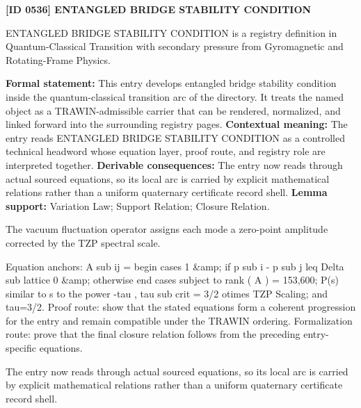 \clearpage
\noindent\textbf{[ID 0536] ENTANGLED BRIDGE STABILITY CONDITION}\par
\vspace{0.35em}
\begingroup\small
{}
ENTANGLED BRIDGE STABILITY CONDITION is a registry definition in Quantum-Classical Transition with secondary pressure from Gyromagnetic and Rotating-Frame Physics.

\begingroup\footnotesize\setlength{\emergencystretch}{3em}\sloppy
\textbf{Formal statement:} This entry develops entangled bridge stability condition inside the quantum-classical transition arc of the directory. It treats the named object as a TRAWIN-admissible carrier that can be rendered, normalized, and linked forward into the surrounding registry pages. \textbf{Contextual meaning:} The entry reads ENTANGLED BRIDGE STABILITY CONDITION as a controlled technical headword whose equation layer, proof route, and registry role are interpreted together. \textbf{Derivable consequences:} The entry now reads through actual sourced equations, so its local arc is carried by explicit mathematical relations rather than a uniform quaternary certificate record shell. \textbf{Lemma support:} Variation Law; Support Relation; Closure Relation.\par
\endgroup

The vacuum fluctuation operator assigns each mode a zero-point amplitude corrected by the TZP spectral scale.

Equation anchors: A sub ij = begin cases 1 \&amp; if p sub i - p sub j leq Delta sub lattice 0 \&amp; otherwise end cases subject to rank ( A ) = 153,600; P(s) similar to s to the power -tau , tau sub crit = 3/2 otimes TZP Scaling; and tau=3/2. Proof route: show that the stated equations form a coherent progression for the entry and remain compatible under the TRAWIN ordering. Formalization route: prove that the final closure relation follows from the preceding entry-specific equations.

The entry now reads through actual sourced equations, so its local arc is carried by explicit mathematical relations rather than a uniform quaternary certificate record shell.
\endgroup


